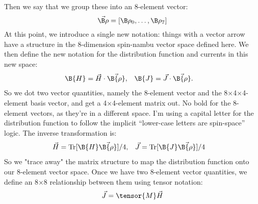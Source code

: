 Then we say that we group these into an 8-element vector:
\begin{equation}
  \vec{\B\rho} = [\B\rho_0, \ldots, \B\rho_7]
\end{equation}
At this point, we introduce a single new notation: things with a vector arrow have a structure in the 8-dimension spin-nambu vector space defined here.
We then define the new notation for the distribution function and currents in this new space:
\begin{align}
  \B{H} &= \vec{H} \cdot \vec{\B{\rho}}, &
  \B{J} &= \vec{J} \cdot \vec{\B{\rho}}.
\end{align}
So we dot two vector quantities, namely the 8-element vector and the 8×4×4-element basis vector, and get a 4×4-element matrix out.
No bold for the 8-element vectors, as they're in a different space.
I'm using a capital letter for the distribution function to follow the implicit ``lower-case letters are spin-space'' logic.
The inverse transformation is:
\begin{align}
  \vec{H} &= \text{Tr}[ \B{H} \vec{\B{\rho}} ] / 4, &
  \vec{J} &= \text{Tr}[ \B{J} \vec{\B{\rho}} ] / 4
\end{align}
So we "trace away" the matrix structure to map the distribution function onto our 8-element vector space.
Once we have two 8-element vector quantities, we define an 8×8 relationship between them using tensor notation:
\begin{align}
  \vec{J} = \tensor{M} \vec{H}
\end{align}
